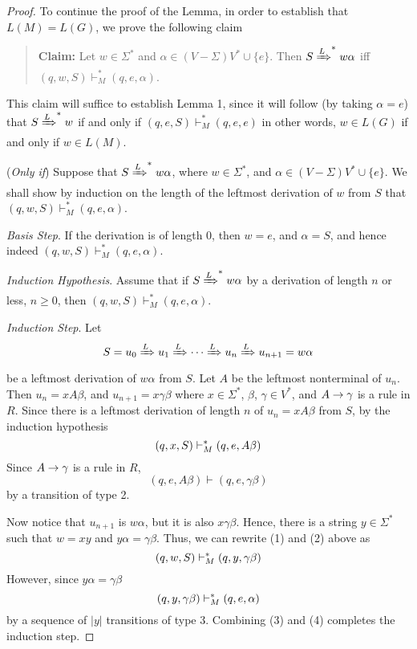 \begin{multicols*}{2}
\begin{proof}
To continue the proof of the Lemma, in order to establish that $L(M) = L(G)$, we prove the following claim

\begin{quote}
\textbf{Claim:} Let $w \in \Sigma^*$ and ${\alpha \in (V - \Sigma)V^* \cup \{ e \}}$. Then ${S \xRightarrow[]{L}^* w\alpha}$ iff ${(q, w, S) \vdash_M^* (q, e, \alpha)}$.
\end{quote}
This claim will suffice to establish Lemma 1, since it will follow (by taking $\alpha = e$) that $S \xRightarrow[]{L}^* w$ if and only if $(q, e, S) \vdash_M^* (q, e, e)$ in other words, $w \in L(G)$ if and only if $w \in L(M)$.

(\textit{Only if}) Suppose that $S \xRightarrow[]{L}^* w\alpha$, where $w \in \Sigma^*$, and $\alpha \in (V - \Sigma)V^* \cup \{ e \}$. We shall show by induction on the length of the leftmost derivation of $w$ from $S$ that $(q, w, S) \vdash_M^* (q, e, \alpha)$.

\noindent \textit{Basis Step}. If the derivation is of length 0, then $w = e$, and $\alpha = S$, and hence indeed $(q, w, S) \vdash_M^* (q, e, \alpha)$.

\noindent \textit{Induction Hypothesis}. Assume that if $S \xRightarrow[]{L}^* w\alpha$ by a derivation of length $n$ or less, $n \geq 0$, then $(q, w, S) \vdash_M^* (q, e, \alpha)$.

\noindent \textit{Induction Step}. Let
\begin{equation*}
  S = u_0 \xRightarrow[]{L} u_1 \xRightarrow[]{L} \cdots \xRightarrow[]{L} u_n \xRightarrow[]{L} u_{n+1} = w\alpha
\end{equation*}
be a leftmost derivation of $w\alpha$ from $S$. Let $A$ be the leftmost nonterminal of $u_n$. Then $u_n = xA\beta$, and $u_{n+1} = x\gamma\beta$ where $x \in \Sigma^*$, $\beta$, $\gamma \in V^*$, and $A \rightarrow \gamma$ is a rule in $R$. Since there is a leftmost derivation of length $n$ of $u_n = xA\beta$ from $S$, by the induction hypothesis
\begin{equation}
  (q, x, S) \vdash_M^* (q, e, A\beta)
\end{equation}
Since $A \rightarrow \gamma$ is a rule in $R$,
\begin{equation}
  (q, e, A\beta) \vdash (q, e, \gamma\beta)
\end{equation}
by a transition of type 2.

Now notice that $u_{n+1}$ is $w\alpha$, but it is also $x\gamma\beta$. Hence, there is a string $y \in \Sigma^*$ such that $w = xy$ and $y\alpha = \gamma\beta$. Thus, we can rewrite (1) and (2) above as
\begin{equation}
  (q, w, S) \vdash_M^* (q, y, \gamma\beta)
\end{equation}
However, since $y\alpha = \gamma\beta$
\begin{equation}
  (q, y, \gamma\beta) \vdash_M^* (q, e, \alpha)
\end{equation}
by a sequence of $|y|$ transitions of type 3. Combining (3) and (4) completes the induction step. 


\end{proof}
\end{multicols*}

